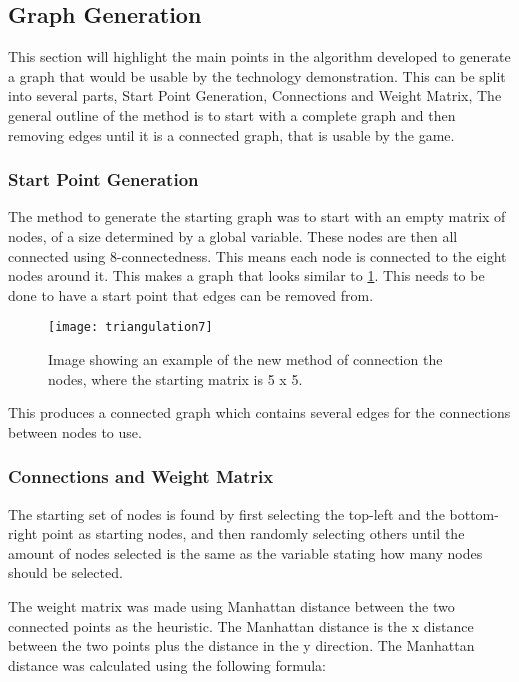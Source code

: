\subsection{Graph Generation}\label{subsec:graphGen}
	This section will highlight the main points in the algorithm developed to generate a graph that would be usable by the technology demonstration. This can be split into several parts, Start Point Generation, Connections and Weight Matrix,
	The general outline of the method is to start with a complete graph and then removing edges until it is a connected graph, that is usable by the game. 

\subsubsection{Start Point Generation}
	The method to generate the starting graph was to start with an empty matrix of nodes, of a size determined by a global variable. These nodes are then all connected using 8-connectedness. This means each node is connected to the eight nodes around it. This makes a graph that looks similar to \ref{fig:triangulation7}. This needs to be done to have a start point that edges can be removed from.

\begin{figure}[H]
	\texttt{[image: triangulation7]}
	\centering
	\caption{Image showing an example of the new method of connection the nodes, where the starting matrix is 5 x 5.}
	\label{fig:triangulation7}
\end{figure}

	This produces a connected graph which contains several edges for the connections between nodes to use.\\

\subsubsection{Connections and Weight Matrix}
	The starting set of nodes is found by first selecting the top-left and the bottom-right point as starting nodes, and then randomly selecting others until the amount of nodes selected is the same as the variable stating how many nodes should be selected.
	\newline
	\par
	The weight matrix was made using Manhattan distance between the two connected points as the heuristic. The Manhattan distance is the x distance between the two points plus the distance in the y direction. The Manhattan distance was calculated using the following formula:\\

